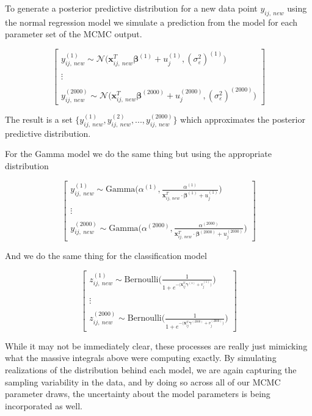 \documentclass[12pt,twoside]{reedthesis}
\begin{document}
To generate a posterior predictive distribution for a new data point \(y_{ij,\ new}\) using the normal regression model we simulate a prediction from the model for each parameter set of the MCMC output.

\[
\begin{bmatrix}
y_{ij, \ new}^{(1)} \sim \mathcal{N}\Big( \mathbf{x}_{ij, \ new}^T \boldsymbol{\beta}^{(1)} + u_j^{(1)}, (\sigma_{\varepsilon}^2)^{(1)}\Big) \\
\\
\vdots \\
\\
y_{ij, \ new}^{(2000)} \sim \mathcal{N}\Big(\mathbf{x}_{ij, \ new}^T \boldsymbol{\beta}^{(2000)} + u_j^{(2000)}, (\sigma_{\varepsilon}^2)^{(2000)}\Big)
\end{bmatrix}
\]

The result is a set \(\Big\{y_{ij , \ new}^{(1)}, y_{ij, \ new}^{(2)}, ..., y_{ij, \ new}^{(2000)}\Big\}\) which approximates the posterior predictive distribution.

For the Gamma model we do the same thing but using the appropriate distribution

\[
\begin{bmatrix}
y_{ij, \ new}^{(1)} \sim \text{Gamma}\Bigg(\alpha^{(1)}, \frac{\alpha^{(1)}}{ \mathbf{x}_{ij, \ new}^T\cdot \boldsymbol{\beta}^{(1)} + u_j^{(1)}}\Bigg) \\
\\
\vdots \\
\\
y_{ij, \ new}^{(2000)} \sim \text{Gamma}\Bigg(\alpha^{(2000)}, \frac{\alpha^{(2000)}}{ \mathbf{x}_{ij, \ new}^T\cdot \boldsymbol{\beta}^{(2000)} + u_j^{(2000)}}\Bigg)
\end{bmatrix}
\]

And we do the same thing for the classification model

\[
\begin{bmatrix}
z_{ij, \ new}^{(1)} \sim \text{Bernoulli}\Bigg(\frac{1}{1 + e^{-\big(\mathbf{x}_{ij}^T\boldsymbol{\gamma}^{(1)} + v_j^{(1)}\big)}}\Bigg) \\
\\ \vdots \\ \\
z_{ij, \ new}^{(2000)} \sim \text{Bernoulli}\Bigg(\frac{1}{1 + e^{-\big(\mathbf{x}_{ij}^T\boldsymbol{\gamma}^{(2000)} + v_j^{(2000)}\big)}}\Bigg)
\end{bmatrix}
\]

While it may not be immediately clear, these processes are really just mimicking what the massive integrals above were computing exactly. By simulating realizations of the distribution behind each model, we are again capturing the sampling variability in the data, and by doing so across all of our MCMC parameter draws, the uncertainty about the model parameters is being incorporated as well.
\end{document}
